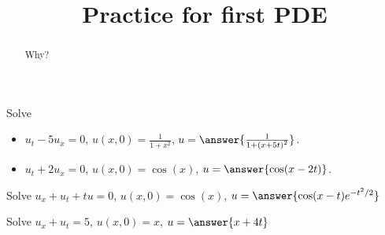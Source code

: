\documentclass{ximera}
\title{Practice for first PDE}
\begin{document}
\begin{abstract}
    Why?
\end{abstract}
\maketitle


\begin{exercise}%
    Solve
    \begin{itemize}
        \item $u_t - 5u_x = 0$, $u(x,0) = \frac{1}{1+x^2}$, $u = \answer{\frac{1}{1+{(x+5t)}^2}}$.
        \item $u_t + 2u_x = 0$, $u(x,0) = \cos(x)$, $u = \answer{\cos(x-2t)}$.
    \end{itemize}
\end{exercise}


\begin{exercise}%
    Solve $u_x+u_t+tu = 0$, $u(x,0) = \cos(x)$, $u = \answer{\cos(x-t)e^{-t^2/2}}$
\end{exercise}



\begin{exercise}%
    Solve $u_x+u_t = 5$, $u(x,0) = x$, $u = \answer{x + 4t}$
\end{exercise}
\end{document}
